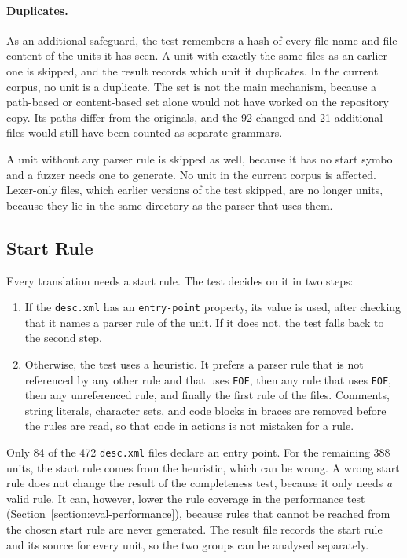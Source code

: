 \documentclass[thesis]{plai}
\begin{document}
\paragraph{Duplicates.}
As an additional safeguard, the test remembers a hash of every file name and file content of the units it has seen. A unit with exactly the same files as an earlier one is skipped, and the result records which unit it duplicates. In the current corpus, no unit is a duplicate. The set is not the main mechanism, because a path-based or content-based set alone would not have worked on the repository copy. Its paths differ from the originals, and the 92 changed and 21 additional files would still have been counted as separate grammars.

A unit without any parser rule is skipped as well, because it has no start symbol and a fuzzer needs one to generate. No unit in the current corpus is affected. Lexer-only files, which earlier versions of the test skipped, are no longer units, because they lie in the same directory as the parser that uses them.

\subsection{Start Rule}
\label{subsection:eval-start-rule}
Every translation needs a start rule. The test decides on it in two steps:
\begin{enumerate}
    \item If the \texttt{desc.xml} has an \texttt{entry-point} property, its value is used, after checking that it names a parser rule of the unit. If it does not, the test falls back to the second step.
    \item Otherwise, the test uses a heuristic. It prefers a parser rule that is not referenced by any other rule and that uses \texttt{EOF}, then any rule that uses \texttt{EOF}, then any unreferenced rule, and finally the first rule of the files. Comments, string literals, character sets, and code blocks in braces are removed before the rules are read, so that code in actions is not mistaken for a rule.
\end{enumerate}
Only 84 of the 472 \texttt{desc.xml} files declare an entry point. For the remaining 388 units, the start rule comes from the heuristic, which can be wrong. A wrong start rule does not change the result of the completeness test, because it only needs \emph{a} valid rule. It can, however, lower the rule coverage in the performance test (Section~\ref{section:eval-performance}), because rules that cannot be reached from the chosen start rule are never generated. The result file records the start rule and its source for every unit, so the two groups can be analysed separately.
\end{document}

